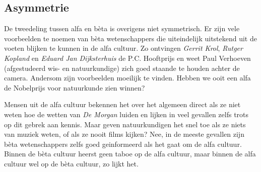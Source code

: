 \subsection{Asymmetrie}

De tweedeling tussen alfa en b\`eta is overigens niet symmetrisch. Er zijn vele voorbeelden te noemen van b\`eta wetenschappers die uiteindelijk uitstekend uit de voeten blijken te kunnen in de alfa cultuur. Zo ontvingen \emph{Gerrit Krol}, \emph{Rutger Kopland} en \emph{Eduard Jan Dijksterhuis}\cite{Hooykaas} de P.C. Hooftprijs en weet Paul Verhoeven (afgestudeerd wis- en natuurkundige) zich goed staande te houden achter de camera. Andersom zijn voorbeelden moeilijk te vinden. Hebben we ooit een alfa de Nobelprijs voor natuurkunde zien winnen?

Mensen uit de alfa cultuur bekennen het over het algemeen direct als ze niet weten hoe de wetten van \emph{De Morgan} luiden en lijken in veel gevallen zelfs trots op dit gebrek aan kennis. Maar geven natuurkundigen het snel toe als ze niets van muziek weten, of als ze nooit films kijken? Nee, in de meeste gevallen zijn b\`eta wetenschappers zelfs goed geinformeerd als het gaat om de alfa cultuur. Binnen de b\`eta cultuur heerst geen taboe op de alfa cultuur, maar binnen de alfa cultuur wel op de b\`eta cultuur, zo lijkt het.
